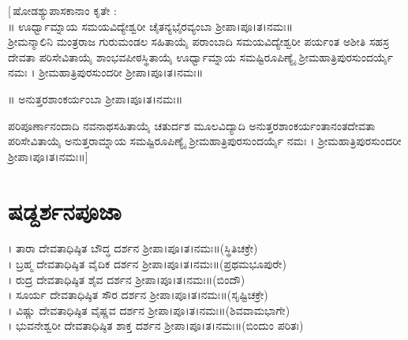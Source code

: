  [\,ಷೋಡಶ್ಯುಪಾಸಕಾನಾಂ ಕೃತೇ :\\
 ॥ ಊರ್ಧ್ವಾಮ್ನಾಯ ಸಮಯವಿದ್ಯೇಶ್ವರೀ ಚೈತನ್ಯಭೈರವ್ಯಂಬಾ ಶ್ರೀಪಾ।ಪೂ।ತ।ನಮಃ॥\\
ಶ್ರೀಮನ್ಮಾಲಿನಿ ಮಂತ್ರರಾಜ ಗುರುಮಂಡಲ ಸಹಿತಾಯೈ ಪರಾಂಬಾದಿ ಸಮಯವಿದ್ಯೇಶ್ವರೀ ಪರ್ಯಂತ ಅಶೀತಿ ಸಹಸ್ರ ದೇವತಾ ಪರಿಸೇವಿತಾಯೈ ಶಾಂಭವಪೀಠಸ್ಥಿತಾಯೈ ಊರ್ಧ್ವಾಮ್ನಾಯ ಸಮಷ್ಟಿರೂಪಿಣ್ಯೈ ಶ್ರೀಮಹಾತ್ರಿಪುರಸುಂದರ್ಯೈ ನಮಃ । ಶ್ರೀಮಹಾತ್ರಿಪುರಸುಂದರೀ ಶ್ರೀಪಾ।ಪೂ।ತ।ನಮಃ॥

॥ ಅನುತ್ತರಶಾಂಕರ್ಯಂಬಾ ಶ್ರೀಪಾ।ಪೂ।ತ।ನಮಃ॥

ಪರಿಪೂರ್ಣಾನಂದಾದಿ ನವನಾಥಸಹಿತಾಯೈ ಚತುರ್ದಶ ಮೂಲವಿದ್ಯಾದಿ ಅನುತ್ತರಶಾಂಕರ್ಯಂತಾನಂತದೇವತಾ ಪರಿಸೇವಿತಾಯೈ  ಅನುತ್ತರಾಮ್ನಾಯ ಸಮಷ್ಟಿರೂಪಿಣ್ಯೈ ಶ್ರೀಮಹಾತ್ರಿಪುರಸುಂದರ್ಯೈ ನಮಃ । ಶ್ರೀಮಹಾತ್ರಿಪುರಸುಂದರೀ ಶ್ರೀಪಾ।ಪೂ।ತ।ನಮಃ॥]\,

\section{ಷಡ್ದರ್ಶನಪೂಜಾ}
। ತಾರಾ ದೇವತಾಧಿಷ್ಠಿತ ಬೌದ್ಧ ದರ್ಶನ ಶ್ರೀಪಾ।ಪೂ।ತ।ನಮಃ॥(ಸ್ಥಿತಿಚಕ್ರೇ)\\
। ಬ್ರಹ್ಮ ದೇವತಾಧಿಷ್ಠಿತ ವೈದಿಕ ದರ್ಶನ ಶ್ರೀಪಾ।ಪೂ।ತ।ನಮಃ॥(ಪ್ರಥಮಭೂಪುರೇ)\\
 । ರುದ್ರ ದೇವತಾಧಿಷ್ಠಿತ ಶೈವ ದರ್ಶನ ಶ್ರೀಪಾ।ಪೂ।ತ।ನಮಃ॥(ಬಿಂದೌ)\\
। ಸೂರ್ಯ ದೇವತಾಧಿಷ್ಠಿತ ಸೌರ ದರ್ಶನ ಶ್ರೀಪಾ।ಪೂ।ತ।ನಮಃ॥(ಸೃಷ್ಟಿಚಕ್ರೇ)\\
। ವಿಷ್ಣು ದೇವತಾಧಿಷ್ಠಿತ ವೈಷ್ಣವ ದರ್ಶನ ಶ್ರೀಪಾ।ಪೂ।ತ।ನಮಃ॥(ಶಿವವಾಮಭಾಗೇ)\\
। ಭುವನೇಶ್ವರೀ ದೇವತಾಧಿಷ್ಠಿತ ಶಾಕ್ತ ದರ್ಶನ ಶ್ರೀಪಾ।ಪೂ।ತ।ನಮಃ॥(ಬಿಂದುಂ ಪರಿತಃ)
